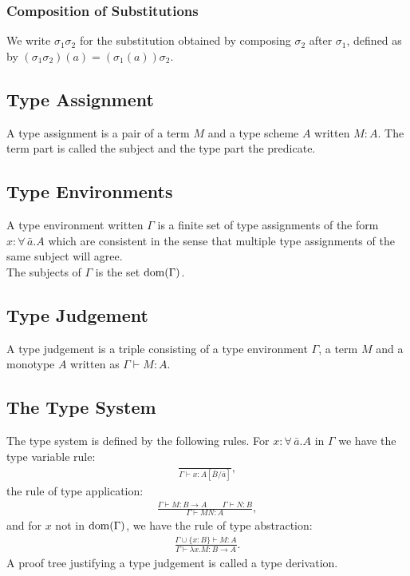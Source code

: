 \subsubsection{Composition of Substitutions}

We write $\sigma_1\sigma_2$ for the substitution obtained by
composing $\sigma_2$ after $\sigma_1$, defined as by
$(\sigma_1\sigma_2)(a) = (\sigma_1(a))\sigma_2$.

\subsection{Type Assignment}

A type assignment is a pair of a term $M$ and a type scheme $A$
written $M:A$. The term part is called the subject and the type
part the predicate.

\subsection{Type Environments}

A type environment written $\Gamma$ is a finite set of
type assignments of the form $x : \forall \, \bar{a}.A$
which are consistent in the sense that multiple 
type assignments of the same subject will agree.
\\[\baselineskip]
The subjects of $\Gamma$ is the set $\operatorname{dom}(\Gamma)$.

\subsection{Type Judgement}

A type judgement is a triple consisting of a type environment $\Gamma$,
a term $M$ and a monotype $A$ written as $\Gamma \vdash M : A$.

\subsection{The Type System}

The type system is defined by the following rules.
For $x : \forall \, \bar{a}.A$ in $\Gamma$ we have the type variable
rule: \begin{align*}
    \frac{}{\Gamma \vdash x : A[\bar{B}/\bar{a}]},
\end{align*} the rule of type application: \begin{align*}
    \frac{
        \Gamma \vdash M : B \to A \qquad \Gamma \vdash N : B
    }{
        \Gamma \vdash MN : A
    },
\end{align*} and for $x$ not in $\operatorname{dom}(\Gamma)$, we have the rule
of type abstraction: \begin{align*}
    \frac{
        \Gamma \cup \{x : B\} \vdash M : A
    }{
        \Gamma \vdash \lambda x.M : B \to A
    }.
\end{align*} A proof tree justifying a type judgement is called a type
derivation.

